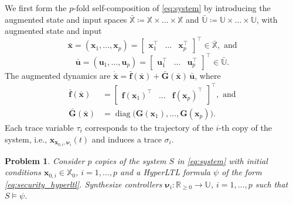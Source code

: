 \documentclass[journal,twoside,web]{ieeecolor}
\newtheorem{problem}[theorem]{Problem}
\begin{document}
We first form the $p$-fold self-composition of \eqref{eq:system} by introducing the augmented state and input spaces $\bar{\mathbb{X}} \coloneqq \mathbb{X} \times \dots \times \mathbb{X} $ and $\bar{\mathbb{U}} \coloneqq \mathbb{U} \times \dots \times \mathbb{U}$, with augmented state and input
\begin{equation*}
    \bar{\mathbf{x}} = (\mathbf{x}_1, \dots, \mathbf{x}_p) = \begin{bmatrix} \mathbf{x}_1^\top & \dots & \mathbf{x}_p^\top \end{bmatrix}^\top \in \bar{\mathbb{X}}, \text{ and}
\end{equation*}
\vspace{-4mm}
\begin{equation*}
    \bar{\mathbf{u}} = (\mathbf{u}_1, \dots, \mathbf{u}_p) = \begin{bmatrix} \mathbf{u}_1^\top & \dots & \mathbf{u}_p^\top \end{bmatrix}^\top \in \bar{\mathbb{U}}.
\end{equation*}
The augmented dynamics are $\dot{\bar{\mathbf{x}}} = \bar{\mathbf{f}}(\bar{\mathbf{x}}) + \bar{\mathbf{G}}(\bar{\mathbf{x}}) \, \bar{\mathbf{u}}$, where 
\begin{equation} \label{eq:augmented_system}
    \begin{aligned}
        \bar{\mathbf{f}}(\bar{\mathbf{x}}) &= \begin{bmatrix}
        \mathbf{f}(\mathbf{x}_1)^\top & \dots & \mathbf{f}(\mathbf{x}_p)^\top \end{bmatrix}^\top, \text{ and} \\ 
        \bar{\mathbf{G}}(\bar{\mathbf{x}}) &= \operatorname{diag} \big( \mathbf{G}(\mathbf{x}_1), \dots, \mathbf{G}(\mathbf{x}_p) \big).
    \end{aligned}
\end{equation}
Each trace variable $\tau_i$ corresponds to the trajectory of the $i$-th copy of the system, i.e., $\mathbf{x}_{\mathbf{x}_{0, i}, \boldsymbol{\nu}_i}(t)$ and induces a trace $\sigma_i$.

\begin{problem}
\label{pr:security_hyperproperty}
    Consider $p$ copies of the system $S$ in \eqref{eq:system} with initial conditions $\mathbf{x}_{0, i} \in \mathbb{X}_0$, $i = 1, \dots, p$ and a HyperLTL formula $\psi$ of the form \eqref{eq:security_hyperltl}. Synthesize controllers $\boldsymbol{\nu}_i: \mathbb{R}_{\ge 0} \to \mathbb{U}$, $i=1, \dots, p$ such that $S \models \psi$.
\end{problem}
\end{document}
